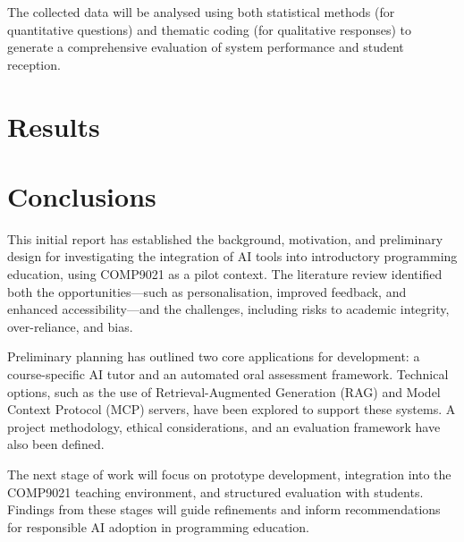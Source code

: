 The collected data will be analysed using both statistical methods (for quantitative questions) and thematic coding (for qualitative responses) to generate a comprehensive evaluation of system performance and student reception.

\chapter{Results}

\chapter{Conclusions}  \label{ch:conclusions}
This initial report has established the background, motivation, and preliminary design for investigating the integration of AI tools into introductory programming education, using COMP9021 as a pilot context. The literature review identified both the opportunities—such as personalisation, improved feedback, and enhanced accessibility—and the challenges, including risks to academic integrity, over-reliance, and bias.

Preliminary planning has outlined two core applications for development: a course-specific AI tutor and an automated oral assessment framework. Technical options, such as the use of Retrieval-Augmented Generation (RAG) and Model Context Protocol (MCP) servers, have been explored to support these systems. A project methodology, ethical considerations, and an evaluation framework have also been defined.

The next stage of work will focus on prototype development, integration into the COMP9021 teaching environment, and structured evaluation with students. Findings from these stages will guide refinements and inform recommendations for responsible AI adoption in programming education.

\nocite{*}